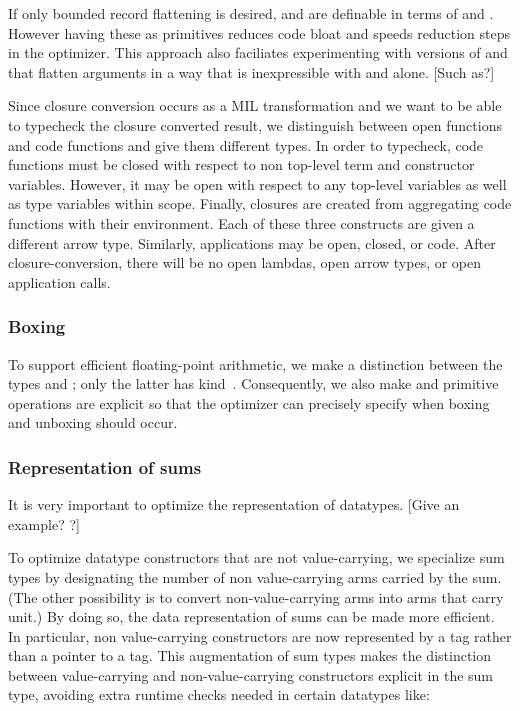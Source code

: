 \documentclass[12pt,twoside]{article}
\begin{document}
If only bounded record flattening is desired,  and
 are definable in terms of  and .
However having these as primitives reduces code bloat and speeds
reduction steps in the optimizer.  This approach also faciliates
experimenting with versions of  and  that
flatten arguments in a way that is inexpressible with
 and  alone.  [Such as?]

Since closure conversion occurs as a MIL transformation and we want to
be able to typecheck the closure converted result, we distinguish
between open functions and code functions and give them different
types.  In order to typecheck, code functions must be closed with
respect to non top-level term and constructor variables.  However, it
may be open with respect to any top-level variables as well as type
variables within scope.  Finally, closures are created from
aggregating code functions with their environment.  Each of these
three constructs are given a different arrow type.  Similarly,
applications may be open, closed, or code.  After closure-conversion,
there will be no open lambdas, open arrow types, or open application
calls.

\subsubsection{Boxing}

To support efficient floating-point arithmetic, we make a distinction
between the types  and ; only the latter has
kind~.  Consequently, we also make  and  primitive
operations are explicit so that the optimizer can precisely specify
when boxing and unboxing should occur.

\subsubsection{Representation of sums}

It is very important to optimize the representation of datatypes.
[Give an example? ?]

To optimize datatype constructors that are not value-carrying, we
specialize sum types by designating the number of non value-carrying
arms carried by the sum.  (The other possibility is to convert
non-value-carrying arms into arms that carry unit.)  By doing so, the
data representation of sums can be made more efficient.  In
particular, non value-carrying constructors are now represented by a
tag rather than a pointer to a tag.  This augmentation of sum types
makes the distinction between value-carrying and non-value-carrying
constructors explicit in the sum type, avoiding extra runtime checks
needed in certain datatypes like:
\end{document}
